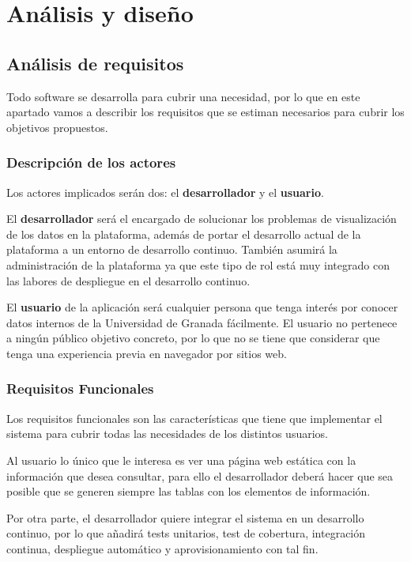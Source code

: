 \chapter{Análisis y diseño}

\section{Análisis de requisitos}

Todo software se desarrolla para cubrir una necesidad, por lo que en este apartado vamos a describir los requisitos que se 
estiman necesarios para cubrir los objetivos propuestos.

\subsection{Descripción de los actores}

Los actores implicados serán dos: el \textbf{desarrollador} y el \textbf{usuario}.

\bigskip
El \textbf{desarrollador} será el encargado de solucionar los problemas de visualización de los datos en la plataforma, además de 
portar el desarrollo actual de la plataforma a un entorno de desarrollo continuo. También asumirá la administración de la 
plataforma ya que este tipo de rol está muy integrado con las labores de despliegue en el desarrollo continuo.

\bigskip
El \textbf{usuario} de la aplicación será cualquier persona que tenga interés por conocer datos internos de la Universidad de Granada 
fácilmente. El usuario no pertenece a ningún público objetivo concreto, por lo que no se tiene que considerar que tenga una
experiencia previa en navegador por sitios web.

\subsection{Requisitos Funcionales}

Los requisitos funcionales son las características que tiene que implementar el sistema para cubrir todas las necesidades de 
los distintos usuarios.

\bigskip
Al usuario lo único que le interesa es ver una página web estática con la información que desea 
consultar, para ello el desarrollador deberá hacer que sea posible que se generen siempre las tablas con los elementos de 
información. 

\bigskip
Por otra parte, el desarrollador quiere integrar el sistema en un desarrollo continuo, por lo que añadirá tests 
unitarios, test de cobertura, integración continua, despliegue automático y aprovisionamiento con tal fin.


